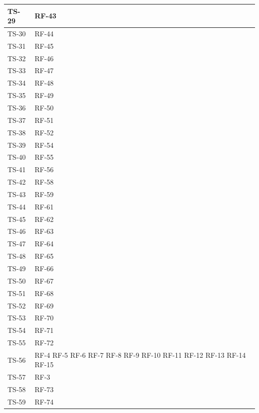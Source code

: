 \documentclass[8pt]{article}
\begin{document}
\begin{longtable}{|>{\centering}p{4cm}|>{\centering\arraybackslash}p{4cm}|}
    \hline
    TS-29 & RF-43 \\
    \hline
    TS-30 & RF-44 \\
    \hline
    TS-31 & RF-45 \\
    \hline
    TS-32 & RF-46 \\
    \hline 
    TS-33 & RF-47 \\
    \hline
    TS-34 & RF-48 \\
    \hline
    TS-35 & RF-49 \\
    \hline
    TS-36 & RF-50 \\
    \hline
    TS-37 & RF-51 \\
    \hline
    TS-38 & RF-52 \\
    \hline
    TS-39 & RF-54 \\
    \hline
    TS-40 & RF-55 \\
    \hline
    TS-41 & RF-56 \\
    \hline
    TS-42 & RF-58 \\
    \hline
    TS-43 & RF-59 \\
    \hline
    TS-44 & RF-61 \\
    \hline
    TS-45 & RF-62 \\
    \hline
    TS-46 & RF-63 \\
    \hline
    TS-47 & RF-64 \\
    \hline
    TS-48 & RF-65 \\
    \hline
    TS-49 & RF-66 \\
    \hline
    TS-50 & RF-67 \\
    \hline
    TS-51 & RF-68 \\
    \hline
    TS-52 & RF-69 \\
    \hline
    TS-53 & RF-70 \\
    \hline
    TS-54 & RF-71 \\
    \hline
    TS-55 & RF-72 \\
    \hline
    TS-56 & RF-4 \newline
            RF-5 \newline
            RF-6 \newline
            RF-7 \newline
            RF-8 \newline
            RF-9 \newline
            RF-10 \newline
            RF-11 \newline
            RF-12 \newline
            RF-13 \newline
            RF-14 \newline
            RF-15 \\
    \hline
    TS-57 & RF-3 \\
    \hline
    TS-58 & RF-73 \\
    \hline
    TS-59 & RF-74 \\
    \hline
\end{longtable}
\clearpage
\end{document}
